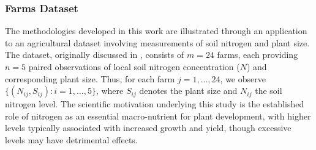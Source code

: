 \subsubsection{Farms Dataset}
\label{farms}
The methodologies developed in this work are illustrated through an application 
to an agricultural dataset involving measurements of soil nitrogen and plant size. 
The dataset, originally discussed in \cite{Crawley2012}, consists of $m=24$ farms, 
each providing $n=5$ paired observations of local soil nitrogen concentration ($N$) 
and corresponding plant size. Thus, for each farm $j=1,\dots,24$, we observe 
$\{(N_{ij}, S_{ij}) : i=1,\dots,5\}$, where $S_{ij}$ denotes the plant size and $N_{ij}$ 
the soil nitrogen level. The scientific motivation underlying this study is the 
established role of nitrogen as an essential macro-nutrient for plant development, 
with higher levels typically associated with increased growth and yield, though 
excessive levels may have detrimental effects. 

